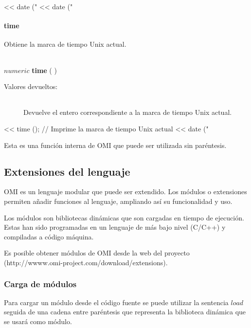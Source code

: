 \begin{myverbatim}  
   << date ("%
   << date ("%
\end{myverbatim}


\paragraph{time}
Obtiene la marca de tiempo Unix actual.  

\begin{framed}
\hfill \\ $numeric$ \textbf{time} ( )  
\begin{description}
\item[Valores devueltos:] \hfill \\
   Devuelve el entero correspondiente a la marca de tiempo Unix actual.
\end{description}
\end{framed}

\begin{myverbatim}  
   << time (); // Imprime la marca de tiempo Unix actual
   << date ("%
\end{myverbatim}

Esta es una función interna de OMI que puede ser utilizada sin paréntesis.

\subsection{Extensiones del lenguaje}
OMI es un lenguaje modular que puede ser extendido. 
Los módulos o extensiones permiten añadir funciones al lenguaje, ampliando así su funcionalidad y uso.

Los módulos son bibliotecas dinámicas que son cargadas en tiempo de ejecución. Estas
han sido programadas en un lenguaje de más bajo nivel (C/C++) y compiladas a código máquina. 

Es posible obtener módulos de OMI desde la web del proyecto 
(http://wwww.omi-project.com/download/extensions). 

\subsubsection{Carga de módulos}
Para cargar un módulo desde el código fuente se puede utilizar la sentencia $load$ seguida de 
una cadena entre paréntesis que representa la biblioteca dinámica que se usará como módulo. \\

